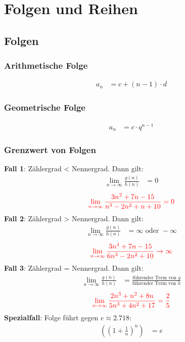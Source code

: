 \section{Folgen und Reihen}
\subsection{Folgen}
\subsubsection{Arithmetische Folge}
\begin{align*}
	a_n & = c + (n-1) \cdot d
\end{align*}
\subsubsection{Geometrische Folge}
\begin{align*}
	a_n & = c \cdot q^{n-1}
\end{align*}

\subsubsection{Grenzwert von Folgen}
\textbf{Fall 1}: Zählergrad < Nennergrad. Dann gilt:
\begin{align*}
	\lim_{n \to \infty} \frac{g(n)}{h(n)} & = 0
\end{align*}
\begin{align*}
	\textcolor{red}{\lim_{n \to \infty} \frac{3n^2 + 7n - 15}{n^3 - 2n^2 + n + 10} = 0}
\end{align*}
\textbf{Fall 2}: Zählergrad > Nennergrad. Dann gilt:
\begin{align*}
	\lim_{n \to \infty} \frac{g(n)}{h(n)} & = \infty \text{ oder } -\infty
\end{align*}
\begin{align*}
	\textcolor{red}{\lim_{n \to \infty} \frac{3n^4 + 7n - 15}{6n^3 - 2n^2 + 10} \to \infty}
\end{align*}
\textbf{Fall 3}: Zählergrad = Nennergrad. Dann gilt:
\begin{align*}
	\lim_{n \to \infty} \frac{g(n)}{h(n)} & = \frac{\text{führender Term von } g}{\text{führender Term von } h}
\end{align*}
\begin{align*}
	\textcolor{red}{\lim_{n \to \infty} \frac{2n^3 + n^2 + 8n}{5n^3 + 4n^2 + 17} = \frac{2}{5}}
\end{align*}
\textbf{Spezialfall}: Folge führt gegen $e \approx 2.718$:
\begin{align*}
	((1+\frac{1}{n})^n) & = e
\end{align*}

